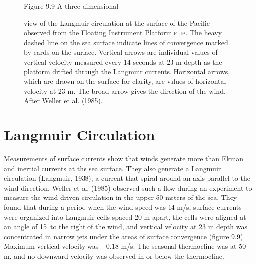 \begin{figure}[t!]
\footnotesize
Figure 9.9 A three-dimensional \rule{0mm}{3ex}view of the Langmuir
circulation at the surface of the Pacific observed from the Floating Instrument
Platform
\textsc{flip}. The heavy dashed line on the sea surface indicate lines of
convergence marked by cards on the surface. Vertical arrows are individual
values of vertical velocity measured every 14 seconds at 23 m depth as the
platform drifted through the Langmuir currents. Horizontal arrows, which are
drawn on the surface for clarity, are values of horizontal velocity at 23 m. The
broad arrow gives the direction of the wind. After Weller et al. (1985).
\label{fig:langmuir}
\vspace{-2ex}
\end{figure}

\section{Langmuir Circulation}
Measurements of surface currents show that winds
generate more than Ekman and inertial currents at the sea surface.
They also generate a Langmuir circulation (Langmuir, 1938), a current that spiral around an
axis parallel to the wind direction. Weller et al. (1985) observed such a flow during an
experiment to measure the wind-driven circulation in the upper 50 meters of the sea.
They found that during a period when the wind speed was 14 m/s, surface currents
were organized into Langmuir cells spaced 20 m apart, the cells were aligned at an
angle of 15\degrees\ to the right of the wind, and vertical velocity at 23 m depth
was concentrated in narrow jets under the areas of surface convergence (figure 9.9).
Maximum vertical velocity was $-0.18$ m/s. The seasonal thermocline
was at 50 m, and no downward velocity was observed in or below the
thermocline.

